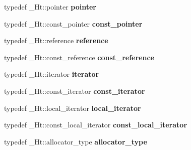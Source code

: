 \begin{DoxyCompactItemize}
\item 
\mbox{\label{classunordered__set_aa493897091ecdb78b06faf2dbe24d980}} 
typedef \+\_\+\+Ht\+::pointer {\bfseries pointer}
\item 
\mbox{\label{classunordered__set_a530b8215a16a26def66642b093302b0c}} 
typedef \+\_\+\+Ht\+::const\+\_\+pointer {\bfseries const\+\_\+pointer}
\item 
\mbox{\label{classunordered__set_a6b2f48081075eba3c3925a77b721d938}} 
typedef \+\_\+\+Ht\+::reference {\bfseries reference}
\item 
\mbox{\label{classunordered__set_a2da7c891dfcbfcb8d3d6c3ac0443c944}} 
typedef \+\_\+\+Ht\+::const\+\_\+reference {\bfseries const\+\_\+reference}
\item 
\mbox{\label{classunordered__set_a0c2a223ad2d069e98617f09b75238d7a}} 
typedef \+\_\+\+Ht\+::iterator {\bfseries iterator}
\item 
\mbox{\label{classunordered__set_ace059a0a0740b43df6a0e742d2979c2e}} 
typedef \+\_\+\+Ht\+::const\+\_\+iterator {\bfseries const\+\_\+iterator}
\item 
\mbox{\label{classunordered__set_a88a3a42ae20a771b6c8036497412f91a}} 
typedef \+\_\+\+Ht\+::local\+\_\+iterator {\bfseries local\+\_\+iterator}
\item 
\mbox{\label{classunordered__set_afe14bd6055b777fcfc1bb556d4dfc218}} 
typedef \+\_\+\+Ht\+::const\+\_\+local\+\_\+iterator {\bfseries const\+\_\+local\+\_\+iterator}
\item 
\mbox{\label{classunordered__set_ac1abae08db0e307fb3ee57fee5179c33}} 
typedef \+\_\+\+Ht\+::allocator\+\_\+type {\bfseries allocator\+\_\+type}
\end{DoxyCompactItemize}
